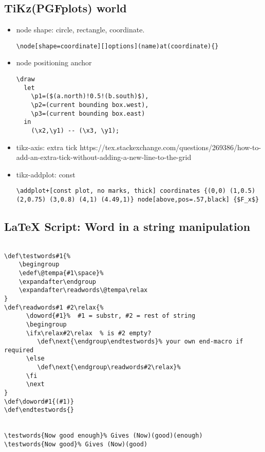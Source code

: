 \subsection{TiKz(PGFplots) world}

\begin{itemize}
\item node shape: circle, rectangle, coordinate.
\begin{lstlisting}
\node[shape=coordinate][]options](name)at(coordinate){}
\end{lstlisting}

\item  node positioning anchor
    \begin{lstlisting}
\draw
  let
    \p1=($(a.north)!0.5!(b.south)$),
    \p2=(current bounding box.west),
    \p3=(current bounding box.east)
  in
    (\x2,\y1) -- (\x3, \y1);
\end{lstlisting}

\item tikz-axis: extra tick
https://tex.stackexchange.com/questions/269386/how-to-add-an-extra-tick-without-adding-a-new-line-to-the-grid

\item tikz-addplot: const
    \begin{lstlisting}
\addplot+[const plot, no marks, thick] coordinates {(0,0) (1,0.5) (2,0.75) (3,0.8) (4,1) (4.49,1)} node[above,pos=.57,black] {$F_x$}
\end{lstlisting}

\end{itemize}

\subsection{\LaTeX{} Script: Word in a string manipulation}

\begin{lstlisting}

\def\testwords#1{%
    \begingroup
    \edef\@tempa{#1\space}%
    \expandafter\endgroup
    \expandafter\readwords\@tempa\relax
}
\def\readwords#1 #2\relax{%
      \doword{#1}%  #1 = substr, #2 = rest of string
      \begingroup
      \ifx\relax#2\relax  % is #2 empty?
         \def\next{\endgroup\endtestwords}% your own end-macro if required
      \else
         \def\next{\endgroup\readwords#2\relax}%
      \fi
      \next
}
\def\doword#1{(#1)}
\def\endtestwords{}


\testwords{Now good enough}% Gives (Now)(good)(enough)
\testwords{Now good}% Gives (Now)(good)
\end{lstlisting}

